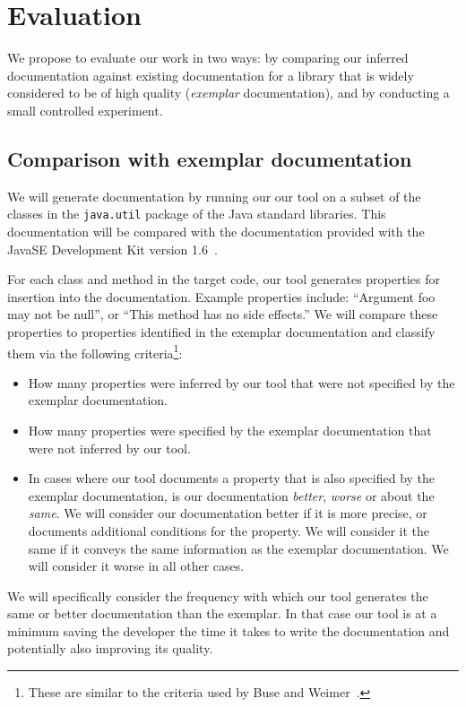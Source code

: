 \section{Evaluation}

We propose to evaluate our work in two ways: by comparing our inferred
documentation against existing documentation for a library that is widely
considered to be of high quality (\textit{exemplar} documentation), and by
conducting a small controlled experiment.

\subsection{Comparison with exemplar documentation}

We will generate documentation by running our our tool on a subset of the
classes in the \texttt{java.util} package of the Java standard libraries. This
documentation will be compared with the documentation provided with the
Java\texttrademark SE Development Kit version 1.6~\cite{JDK6}.

For each class and method in the target code, our tool generates properties for
insertion into the documentation. Example properties include: ``Argument foo
may not be null'', or ``This method has no side effects.'' We will compare
these properties to properties identified in the exemplar documentation and
classify them via the following criteria\footnote{These are similar to the
criteria used by Buse and Weimer~\cite{autodoc}.}:

\begin{itemize}
\item How many properties were inferred by our tool that were not specified by
  the exemplar documentation.
\item How many properties were specified by the exemplar documentation that
  were not inferred by our tool.
\item In cases where our tool documents a property that is also specified by
  the exemplar documentation, is our documentation \textit{better},
  \textit{worse} or about the \textit{same}. We will consider our documentation
  better if it is more precise, or documents additional conditions for the
  property. We will consider it the same if it conveys the same information as
  the exemplar documentation. We will consider it worse in all other cases.
\end{itemize}

We will specifically consider the frequency with which our tool generates the
same or better documentation than the exemplar. In that case our tool is at a
minimum saving the developer the time it takes to write the documentation and
potentially also improving its quality.

